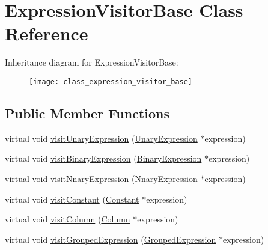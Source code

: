 \hypertarget{class_expression_visitor_base}{\section{Expression\+Visitor\+Base Class Reference}
\label{class_expression_visitor_base}
}
Inheritance diagram for Expression\+Visitor\+Base\+:\begin{figure}[H]
\begin{center}
\leavevmode
\texttt{[image: class\_expression\_visitor\_base]}
\end{center}
\end{figure}
\subsection*{Public Member Functions}
\begin{DoxyCompactItemize}
\item 
virtual void \hyperlink{class_expression_visitor_base_a9750397f5588263509a28ca9f17e8bc4}{visit\+Unary\+Expression} (\hyperlink{class_unary_expression}{Unary\+Expression} $\ast$expression)
\item 
virtual void \hyperlink{class_expression_visitor_base_aebbbbe9a1cecabe4c4804bf1ef82a9f9}{visit\+Binary\+Expression} (\hyperlink{class_binary_expression}{Binary\+Expression} $\ast$expression)
\item 
virtual void \hyperlink{class_expression_visitor_base_a010c5ba36b255c8576a2b36aaf9692d8}{visit\+Nnary\+Expression} (\hyperlink{class_nnary_expression}{Nnary\+Expression} $\ast$expression)
\item 
virtual void \hyperlink{class_expression_visitor_base_a64921e6a6a4945faf693e9ef8d6310a4}{visit\+Constant} (\hyperlink{class_constant}{Constant} $\ast$expression)
\item 
virtual void \hyperlink{class_expression_visitor_base_a1ac638b82248ff9e1582dbf520dc6ae4}{visit\+Column} (\hyperlink{class_column}{Column} $\ast$expression)
\item 
virtual void \hyperlink{class_expression_visitor_base_aec22a7bb476fc79e7997d188423514c0}{visit\+Grouped\+Expression} (\hyperlink{class_grouped_expression}{Grouped\+Expression} $\ast$expression)
\end{DoxyCompactItemize}


